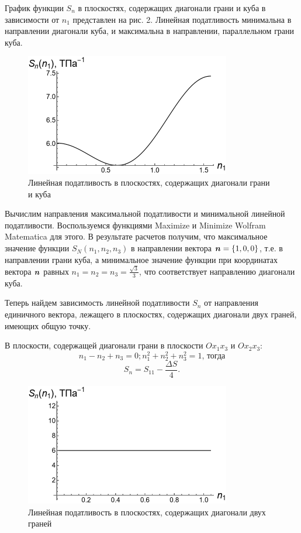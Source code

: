 \documentclass[12pt, a4paper]{article}
\renewcommand{\vec}[1]{\text{\mathversion{bold}${#1}$}}%
\begin{document}
График функции $S_n$ в плоскостях, содержащих диагонали грани и куба в зависимости от $n_1$ представлен на рис. 2. Линейная податливость минимальна в направлении диагонали куба, и
максимальна в направлении, параллельном грани куба.
\begin{figure}[!htbp]
	\centering
	\includegraphics[width=0.8\textwidth]{pic-2}%
	\caption{Линейная податливость в плоскостях, содержащих диагонали грани и куба}
	\vspace*{-2mm}
	\label{lin-grani-kuba}
\end{figure}

Вычислим направления максимальной податливости и минимальной линейной податливости. Воспользуемся функциями Maximize и Minimize Wolfram Matematica для этого. В результате расчетов получим, что максимальное значение функции $S_N(n_1, n_2, n_3)$ в направлении вектора $\vec{n} = \{1, 0, 0\}$, т.е. в направлении грани куба, а минимальное значение функции при координатах вектора $\vec{n}$ равных $n_1 = n_2 = n_3 = \frac{\sqrt{3}}{3}$, что соответствует направлению диагонали куба.

Теперь найдем зависимость линейной податливости $S_n$ от направления единичного вектора, лежащего в плоскостях, содержащих диагонали двух граней, имеющих общую точку.

В плоскости, содержащей диагонали грани в плоскости $O x_1 x_3$ и $O x_2 x_3$: 
\[
n_1 - n_2 + n_3 = 0; n_1^2 + n_2^2 + n_3^2 = 1 \text{, тогда}
\]
\[
S_n = S_{11} - \frac{\Delta{S}}{4}.
\]

\begin{figure}[!htbp]
	\centering
	\includegraphics[width=0.8\textwidth]{pic-5}%
	\caption{Линейная податливость в плоскостях, содержащих диагонали двух граней}
	\vspace*{-2mm}
	\label{lin-grani-2-kuba}
\end{figure}
\newpage
\end{document}
